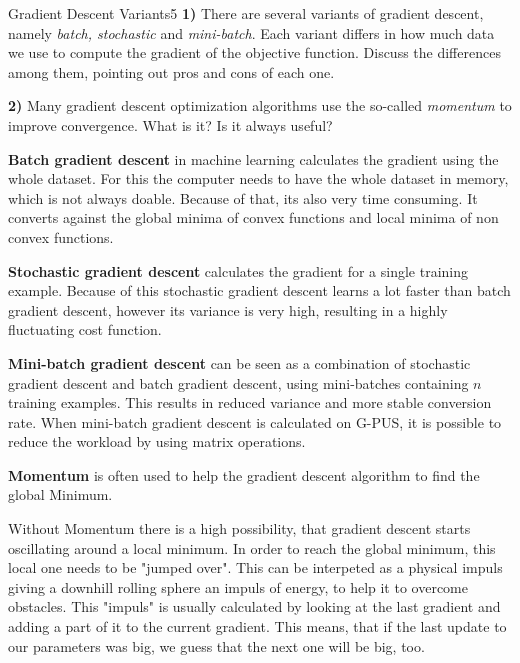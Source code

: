 \begin{questions}
\begin{question}{Gradient Descent Variants}{5}
\textbf{1)} There are several variants of gradient descent, namely \emph{batch, stochastic} and \emph{mini-batch}. Each variant differs in how much data we use to compute the gradient of the objective function. 
Discuss the differences among them, pointing out pros and cons of each one.

\textbf{2)} Many gradient descent optimization algorithms use the so-called \emph{momentum} to improve convergence. What is it? Is it always useful?

\begin{answer}



\textbf{Batch gradient descent} in machine learning calculates the gradient using the whole dataset. For this the computer needs to have the whole dataset in memory, which is not always doable. Because of that, its also very time consuming. It converts against the global minima of convex functions and local minima of non convex functions.

\textbf{Stochastic gradient descent} calculates the gradient for a single training example. Because of this stochastic gradient descent learns a lot faster than batch gradient descent, however its variance is very high, resulting in a highly fluctuating cost function.


\textbf{Mini-batch gradient descent} can be seen as a combination of stochastic gradient descent and batch gradient descent, using mini-batches containing $n$ training examples. This results in reduced variance and more stable conversion rate. When mini-batch gradient descent is calculated on G-PUS, it is possible to reduce the workload by using matrix operations.


\textbf{Momentum} is often used to help the gradient descent algorithm to find the global Minimum. 

Without Momentum there is a high possibility, that gradient descent starts oscillating around a local minimum. In order to reach the global minimum, this local one needs to be "jumped over". This can be interpeted as a physical impuls giving a downhill rolling sphere an impuls of energy, to help it to overcome obstacles. This "impuls" is usually calculated by looking at the last gradient and adding a part of it to the current gradient. This means, that if the last update to our parameters was big, we guess that the next one will be big, too.
\end{answer}


\end{question}
\end{questions}
